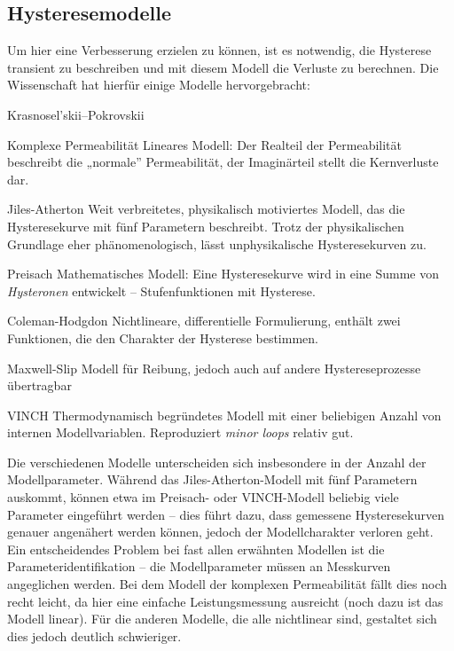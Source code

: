 \documentclass{scrartcl}
\begin{document}
\subsection{Hysteresemodelle}
Um hier eine Verbesserung erzielen zu können, ist es notwendig, die Hysterese transient zu beschreiben und mit diesem Modell die Verluste zu berechnen. Die Wissenschaft hat hierfür einige Modelle hervorgebracht:
\begin{labeling}{Krasnosel’skii–Pokrovskii}
	\item[Komplexe Permeabilität]{Lineares Modell: Der Realteil der Permeabilität beschreibt die „normale” Permeabilität, der Imaginärteil stellt die Kernverluste dar.}
	\item[Jiles-Atherton \cite{ja}]{Weit verbreitetes, physikalisch motiviertes Modell, das die Hysteresekurve mit fünf Parametern beschreibt. Trotz der physikalischen Grundlage eher phänomenologisch, lässt unphysikalische Hysteresekurven zu.}
	\item[Preisach \cite{preisach}]{Mathematisches Modell: Eine Hysteresekurve wird in eine Summe von \emph{Hysteronen} entwickelt -- Stufenfunktionen mit Hysterese.}
	\item[Coleman-Hodgdon]{Nichtlineare, differentielle Formulierung, enthält zwei Funktionen, die den Charakter der Hysterese bestimmen.}
	\item[Maxwell-Slip]{Modell für Reibung, jedoch auch auf andere Hystereseprozesse übertragbar}
	\item[VINCH \cite{vinch}]{Thermodynamisch begründetes Modell mit einer beliebigen Anzahl von internen Modellvariablen. Reproduziert \emph{minor loops} relativ gut.}
\end{labeling}
Die verschiedenen Modelle unterscheiden sich insbesondere in der Anzahl der Modellparameter. Während das Jiles-Atherton-Modell mit fünf Parametern auskommt, können etwa im Preisach- oder VINCH-Modell beliebig viele Parameter eingeführt werden -- dies führt dazu, dass gemessene Hysteresekurven genauer angenähert werden können, jedoch der Modellcharakter verloren geht.\\
Ein entscheidendes Problem bei fast allen erwähnten Modellen ist die Parameteridentifikation -- die Modellparameter müssen an Messkurven angeglichen werden. Bei dem Modell der komplexen Permeabilität fällt dies noch recht leicht, da hier eine einfache Leistungsmessung ausreicht (noch dazu ist das Modell linear). Für die anderen Modelle, die alle nichtlinear sind, gestaltet sich dies jedoch deutlich schwieriger.
\end{document}
